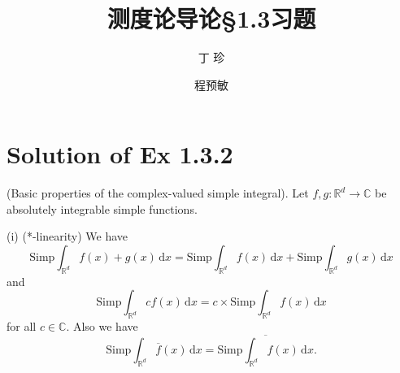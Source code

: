 \documentclass[reqno,a4paper,10pt]{amsart}
\title{\textbf{测度论导论\S1.3习题}}
\author{丁\;\;\; 珍}
\author{程预敏}
\newcommand\dif{\,\mathrm{d}}
\begin{document}
\maketitle


\section{Solution of Ex 1.3.2}
(Basic properties of the complex-valued simple integral). Let $f,g: \mathbb{R}^d\to \mathbb{C}$ be absolutely integrable simple functions.

(i) (*-linearity) We have 
\begin{equation}
    \mathrm{Simp}\int_{\mathbb{R}^d} f(x)+g(x)\dif x= \mathrm{Simp}\int_{\mathbb{R}^d} f(x)\dif x+\mathrm{Simp}\int_{\mathbb{R}^d} g(x)\dif x
    \label{additivity}
\end{equation}
and 
\begin{equation}
    \mathrm{Simp}\int_{\mathbb{R}^d} c f(x)\dif x=c\times\mathrm{Simp} \int_{\mathbb{R}^d} f(x)\dif x
    \label{dot_multi}
\end{equation}
for all $c\in \mathbb{C}$. Also we have 
\begin{equation}
    \mathrm{Simp} \int_{\mathbb{R}^d} \overline{f}(x)\dif x=\overline{\mathrm{Simp}\int_{\mathbb{R}^d} f(x)\dif x}.
    \label{conjugation}
\end{equation}
\end{document}
